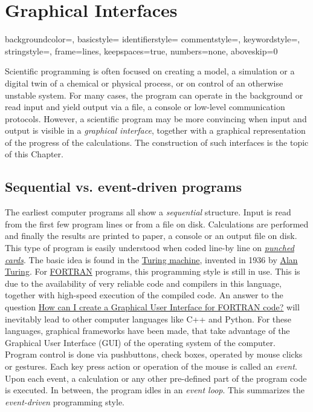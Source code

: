 \section{Graphical Interfaces}

{
	backgroundcolor=\color{black},
	basicstyle=\footnotesize\color{white}\ttfamily
	identifierstyle=\color{white}
	commentstyle=\color{white},
	keywordstyle=\color{white},
	stringstyle=\color{white},
	frame=lines,
	keepspaces=true,
	numbers=none,
	aboveskip=0\baselineskip
}

Scientific programming is often focused on creating a model, a simulation or a digital twin of a chemical or physical process, or on control of an otherwise unstable system. For many cases, the program can operate in the background or read input and yield output via a file, a console or low-level communication protocols. However, a scientific program may be more convincing when input and output is visible in a \emph{graphical interface}, together with a graphical representation of the progress of the calculations. The construction of such interfaces is the topic of this Chapter. 

\subsection{Sequential vs. event-driven programs}

The earliest computer programs all show a \emph{sequential} structure. Input is read from the first few program lines or from a file on disk. Calculations are performed and finally the results are printed to paper, a console or an output file on disk. This type of program is easily understood when coded line-by line on \href{https://en.wikipedia.org/wiki/Punched_card}{\emph{punched cards}}. The basic idea is found in the \href{https://en.wikipedia.org/wiki/Turing_machine}{Turing machine}, invented in 1936 by \href{https://en.wikipedia.org/wiki/Alan_Turing}{Alan Turing}.
For \href{https://en.wikipedia.org/wiki/Fortran}{FORTRAN} programs, this programming style is still in use. This is due to the availability of very reliable code and compilers in this language, together with high-speed execution of the compiled code.
An answer to the question  \href{https://www.researchgate.net/post/How_can_I_create_a_Graphical_User_Interface_for_FORTRAN_code}{How can I create a Graphical User Interface for FORTRAN code?} will inevitably lead to other computer languages like C++ and Python. For these languages, graphical frameworks have been made, that take advantage of the Graphical User Interface (GUI) of the operating system of the computer. Program control is done via pushbuttons, check boxes, operated by mouse clicks or gestures. Each key press action or operation of the mouse is called an \emph{event}. Upon each event, a calculation or any other pre-defined part of the program code is executed. In between, the program idles in an \emph{event loop}. This summarizes the \emph{event-driven} programming style.  

